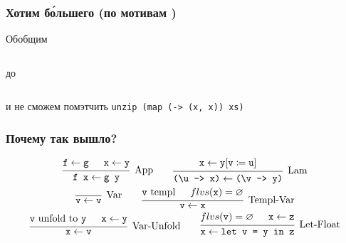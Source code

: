 \documentclass[
    aspectratio=169,
]{beamer}
\begin{document}
\begin{frame}
    \frametitle{Хотим б\'{о}льшего (по мотивам \cite{reindersHigherOrderPatterns2024})}

    Обобщим
    \inputminted[firstline=117, lastline=119]{text}{Code.hs}
    до
    \inputminted[firstline=126, lastline=129]{text}{Code.hs}
    и не сможем помэтчить \texttt{unzip (map (\x -> (x, x)) xs)}
\end{frame}

\begin{frame}
    \frametitle{Почему так вышло?}

    \begin{spreadlines}{2em}
        \begin{gather*}
            \begin{prooftree}
                \hypo{\text{\texttt{f}} \leftarrow \text{\texttt{g}}}
                \hypo{\text{\texttt{x}} \leftarrow \text{\texttt{y}}}
                \infer2[App]{\text{\texttt{f x}} \leftarrow \text{\texttt{g y}} }
            \end{prooftree} \qquad
            \begin{prooftree}
                \hypo{\text{\texttt{x}} \leftarrow \text{\texttt{y}}[\text{\texttt{v}} \coloneq \text{\texttt{u}}]}
                \infer1[Lam]{\text{\texttt{(\textbackslash{}u -> x)}} \leftarrow \text{\texttt{(\textbackslash{}v -> y)}}}
            \end{prooftree} \\
            \begin{prooftree}
                \infer0[Var]{\text{\texttt{v}} \leftarrow \text{\texttt{v}}}
            \end{prooftree} \qquad
            \begin{prooftree}
                \hypo{\text{\texttt{v} templ}}
                \hypo{flvs(\text{\texttt{x}}) = \varnothing}
                \infer2[Templ-Var]{\text{\texttt{v}} \leftarrow \text{\texttt{x}}}
            \end{prooftree} \\
            \begin{prooftree}
                \hypo{\text{\texttt{v} unfold to \texttt{y}}}
                \hypo{\text{\texttt{x}} \leftarrow \text{\texttt{y}}}
                \infer2[Var-Unfold]{\hypo{\text{\texttt{x}} \leftarrow \text{\texttt{v}}}}
            \end{prooftree} \qquad
            \begin{prooftree}
                \hypo{flvs(\text{\texttt{v}}) = \varnothing}
                \hypo{\text{\texttt{x}} \leftarrow \text{\texttt{z}}}
                \infer2[Let-Float]{\text{\texttt{x}} \leftarrow \text{\texttt{let v = y in z}}}
            \end{prooftree}
        \end{gather*}
    \end{spreadlines}
\end{frame}
\end{document}
